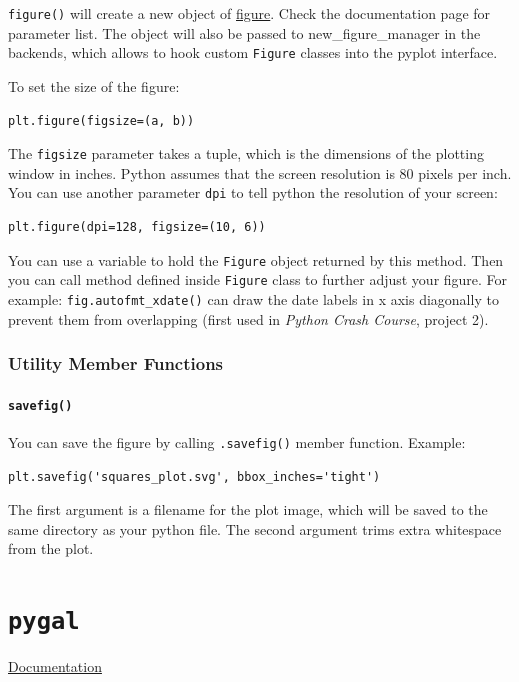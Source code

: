 \documentclass[12pt]{book}
\begin{document}
\texttt{figure()} will create a new object of \href{https://matplotlib.org/3.1.0/api/\_as\_gen/matplotlib.figure.Figure.html\#matplotlib-figure-figure}{figure}. Check the documentation page for parameter list. The object will also be passed to new\_figure\_manager in the backends, which allows to hook custom \texttt{Figure} classes into the pyplot interface.

To set the size of the figure:
\begin{verbatim}
plt.figure(figsize=(a, b))
\end{verbatim}
The \texttt{figsize} parameter takes a tuple, which is the dimensions of the plotting window in inches. Python assumes that the screen resolution is 80 pixels per inch. You can use another parameter \texttt{dpi} to tell python the resolution of your screen:
\begin{verbatim}
plt.figure(dpi=128, figsize=(10, 6))
\end{verbatim}

You can use a variable to hold the \texttt{Figure} object returned by this method. Then you can call method defined inside \texttt{Figure} class to further adjust your figure. For example: \texttt{fig.autofmt\_xdate()} can draw the date labels in x axis diagonally to prevent them from overlapping (first used in \emph{Python Crash Course}, project 2).

\subsection{Utility Member Functions}
\label{sec:org50168d4}
\subsubsection{\texttt{savefig()}}
\label{sec:orgc56d779}
You can save the figure by calling \texttt{.savefig()} member function. Example:
\begin{verbatim}
plt.savefig('squares_plot.svg', bbox_inches='tight')
\end{verbatim}
The first argument is a filename for the plot image, which will be saved to the same directory as your python file. The second argument trims extra whitespace from the plot.

\chapter{\texttt{pygal}}
\label{sec:orgf916472}
\href{http://pygal.org/en/stable/documentation/index.html}{Documentation}
\end{document}
